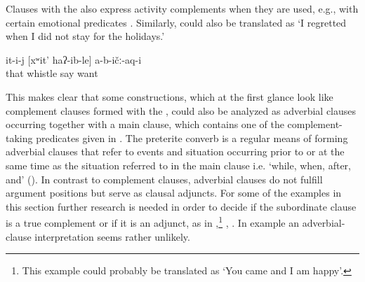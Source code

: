 Clauses with the  also express activity complements when they are used, e.g., with certain emotional predicates . Similarly,  could also be translated as `I regretted when I did not stay for the holidays.' 

%
\begin{exe}
	\ex	\label{ex:He did not like when one whistled}
	\gll	it-i-j	[xʷit'	haʔ-ib-le]	a-b-ičː-aq-i\\
		that	whistle	say	want\\
	\glt	{}
\end{exe}

This makes clear that some constructions, which at the first glance look like complement clauses formed with the , could also be analyzed as adverbial clauses occurring together with a main clause, which contains one of the complement-taking predicates given in . The preterite converb is a regular means of forming adverbial clauses that refer to events and situation occurring prior to or at the same time as the situation referred to in the main clause i.e. `while, when, after, and' (). In contrast to complement clauses, adverbial clauses do not fulfill argument positions but serve as clausal adjuncts. For some of the examples in this section further research is needed in order to decide if the subordinate clause is a true complement or if it is an adjunct, as in ,\footnote{This example could probably be translated as `You came and I am happy'.} , . In example  an adverbial-clause interpretation seems rather unlikely.

